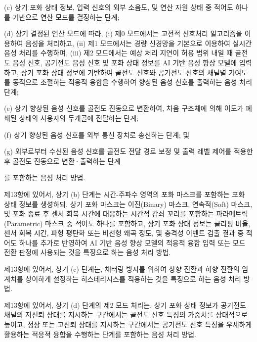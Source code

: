 \documentclass{article}
\DeclareRobustCommand{\codexedit}[1]{\textcolor{customorange}{#1}}
\DeclareRobustCommand{\vtwoedit}[1]{\textcolor{customgreen}{#1}}
\begin{document}
\begin{enumerate}[label=\textbf{[\arabic*]}]
    \codexedit{(c) \vtwoedit{상기 포화 상태 정보}, 입력 신호의 외부 소음도, 및 연산 자원 상태 중 적어도 하나를 기반으로 연산 모드를 결정하는 단계;}

    \codexedit{(d) 상기 결정된 연산 모드에 따라, (i) 제0 모드에서는 고전적 신호처리 알고리즘을 이용하여 음성을 처리하고, (ii) 제1 모드에서는 경량 신경망을 기본으로 이용하여 실시간 음성 처리를 수행하며, (iii) 제2 모드에서는 예상 처리 지연이 허용 범위 내일 때 골전도 음성 신호, 공기전도 음성 신호 및 \vtwoedit{포화 상태 정보}를 AI 기반 음성 향상 모델에 입력하고, 상기 \vtwoedit{포화 상태 정보}에 기반하여 골전도 신호와 공기전도 신호의 채널별 기여도를 동적으로 조절하는 적응적 융합을 수행하여 향상된 음성 신호를 출력하는 음성 처리 단계;}

    (e) 상기 향상된 음성 신호를 골전도 진동으로 변환하여, 차음 구조체에 의해 이도가 폐쇄된 상태의 사용자의 두개골에 전달하는 단계;

    (f) 상기 향상된 음성 신호를 외부 통신 장치로 송신하는 단계; 및

    (g) 외부로부터 수신된 음성 신호를 골전도 전달 경로 보정 및 출력 레벨 제어를 적용한 후 골전도 진동으로 변환·출력하는 단계

    를 포함하는 음성 처리 방법.


    \item \codexedit{제13항에 있어서,
    \vtwoedit{상기 (b) 단계는 시간-주파수 영역의 포화 마스크를 포함하는 포화 상태 정보를 생성하되,}
    \vtwoedit{상기 포화 마스크는 이진(Binary) 마스크, 연속적(Soft) 마스크, 및 포화 종료 후 센서 회복 시간에 대응하는 시간적 감쇠 꼬리를 포함하는 파라메트릭(Parametric) 마스크 중 적어도 하나를 포함하고,}
    \vtwoedit{상기 포화 상태 정보는 클리핑 비율, 센서 회복 시간, 파형 평탄화 또는 비선형 왜곡 정도, 및 충격성 이벤트 검출 결과 중 적어도 하나를 추가로 반영하여 AI 기반 음성 향상 모델의 적응적 융합 입력 또는 모드 전환 판정에 사용되는 것을 특징으로 하는 음성 처리 방법.}}

    \item \codexedit{제13항에 있어서,
    상기 (c) 단계는, 채터링 방지를 위하여 상향 전환과 하향 전환의 임계치를 상이하게 설정하는 히스테리시스를 적용하는 것을 특징으로 하는 음성 처리 방법.}

    \item \codexedit{제13항에 있어서,
    \vtwoedit{상기 (d) 단계의 제2 모드 처리는, 상기 포화 상태 정보가 공기전도 채널의 저신뢰 상태를 지시하는 구간에서는 골전도 신호 특징의 가중치를 상대적으로 높이고, 정상 또는 고신뢰 상태를 지시하는 구간에서는 공기전도 신호 특징을 우세하게 활용하는 적응적 융합을 수행하는 단계를 포함하는 음성 처리 방법.}}


\end{enumerate}
\end{document}

